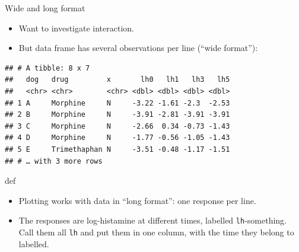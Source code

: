 \documentclass[ignorenonframetext,]{beamer}
\newenvironment{Shaded}{\begin{snugshade}}{\end{snugshade}}
\newcommand{\DataTypeTok}[1]{\textcolor[rgb]{0.13,0.29,0.53}{#1}}
\newcommand{\DecValTok}[1]{\textcolor[rgb]{0.00,0.00,0.81}{#1}}
\newcommand{\KeywordTok}[1]{\textcolor[rgb]{0.13,0.29,0.53}{\textbf{#1}}}
\newcommand{\NormalTok}[1]{#1}
\newcommand{\OperatorTok}[1]{\textcolor[rgb]{0.81,0.36,0.00}{\textbf{#1}}}
\newcommand{\StringTok}[1]{\textcolor[rgb]{0.31,0.60,0.02}{#1}}
\begin{document}
\begin{frame}[fragile]{Wide and long format}
\protect\hypertarget{wide-and-long-format}{}

\begin{itemize}
\item
  Want to investigate interaction.
\item
  But data frame has several observations per line (``wide format''):
\end{itemize}

\begin{Shaded}
\end{Shaded}

\begin{verbatim}
## # A tibble: 8 x 7
##   dog   drug         x       lh0   lh1   lh3   lh5
##   <chr> <chr>        <chr> <dbl> <dbl> <dbl> <dbl>
## 1 A     Morphine     N     -3.22 -1.61 -2.3  -2.53
## 2 B     Morphine     N     -3.91 -2.81 -3.91 -3.91
## 3 C     Morphine     N     -2.66  0.34 -0.73 -1.43
## 4 D     Morphine     N     -1.77 -0.56 -1.05 -1.43
## 5 E     Trimethaphan N     -3.51 -0.48 -1.17 -1.51
## # … with 3 more rows
\end{verbatim}

def

\begin{itemize}
\item
  Plotting works with data in ``long format'': one response per line.
\item
  The responses are log-histamine at different times, labelled
  \texttt{lh}-something. Call them all \texttt{lh} and put them in one
  column, with the time they belong to labelled.
\end{itemize}

\end{frame}
\end{document}
